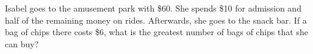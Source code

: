 Isabel goes to the amusement park with \$60. She spends \$10 for admission and half of the remaining money on rides. Afterwards, she goes to the snack bar. If a bag of chips there costs \$6, what is the greatest number of bags of chips that she can buy?
